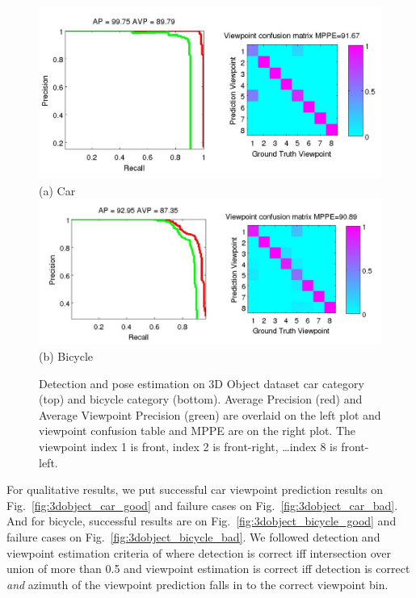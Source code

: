 \documentclass[10pt,twocolumn,letterpaper]{article}
\begin{document}
\begin{figure}[h]
  \centering
  \includegraphics[width=0.99\linewidth]{supp/car_ap_3dobject_tight.png}\\
  \vspace{-5pt}
    (a) Car\\
  \includegraphics[width=0.99\linewidth]{supp/bicycle_ap_3dobject_tight.png}\\
  \vspace{-5pt}
    (b) Bicycle\\
  \caption{Detection and pose estimation on 3D Object dataset car category (top) and bicycle category (bottom).
  Average Precision (red) and Average Viewpoint Precision (green) are overlaid on the left plot and
  viewpoint confusion table and MPPE are on the right plot. The viewpoint index 1 is front, index 2 is
  front-right, \dots index 8 is front-left.}
  \label{fig:3dobject_ap}
\end{figure}

For qualitative results, we put successful car viewpoint prediction results on
Fig.~\ref{fig:3dobject_car_good} and
failure cases on Fig.~\ref{fig:3dobject_car_bad}. And for bicycle, successful
results are on Fig.~\ref{fig:3dobject_bicycle_good} and
failure cases on Fig.~\ref{fig:3dobject_bicycle_bad}. We followed detection
and viewpoint estimation criteria of \cite{Xiang12} where detection is correct
iff intersection over union of more than 0.5 and viewpoint estimation is
correct iff detection is correct \emph{and} azimuth of the viewpoint
prediction falls in to the correct viewpoint bin.
\end{document}
